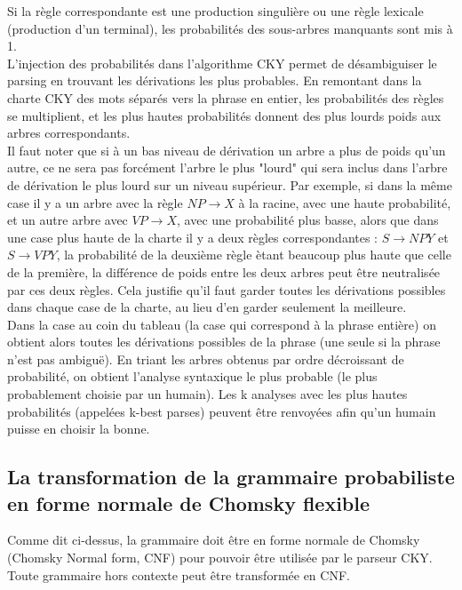 \documentclass[12pt]{article}
\begin{document}
Si la r\`egle correspondante est une production singuli\`ere ou une r\`egle lexicale
(production d'un terminal), les probabilit\'es des sous-arbres manquants sont mis
\`a 1. \\

L'injection des probabilit\'es dans l'algorithme CKY permet de d\'esambiguiser le
parsing en trouvant les d\'erivations les plus probables. En remontant dans la
charte CKY des mots s\'epar\'es vers la phrase en entier, les probabilit\'es des
r\`egles se multiplient, et les plus hautes probabilit\'es donnent des plus lourds
poids aux arbres correspondants. \\

Il faut noter que si \`a un bas niveau de
d\'erivation un arbre a plus de poids qu'un autre, ce ne sera pas forc\'ement
l'arbre le plus "lourd"  qui sera inclus dans l'arbre de d\'erivation le plus
lourd sur un niveau sup\'erieur. Par exemple, si dans la m\^eme case il y a un arbre
avec la r\`egle $NP \rightarrow X$ \`a la racine, avec une haute probabilit\'e, et un
autre arbre avec $VP \rightarrow X$, avec une probabilit\'e plus basse, alors que
dans une case plus haute de la charte il y a deux r\`egles correspondantes : $S
\rightarrow NP Y$ et $S \rightarrow VP Y$, la probabilit\'e de la deuxi\`eme r\`egle
\`etant beaucoup plus haute que celle de la premi\`ere, la diff\'erence de poids entre
les deux arbres peut \^etre neutralis\'ee par ces deux r\`egles. Cela justifie qu'il
faut garder toutes les d\'erivations possibles dans chaque case de la charte, au
lieu d'en garder seulement la meilleure. \\

Dans la case au coin du tableau (la case qui correspond \`a la phrase enti\`ere) on
obtient alors toutes les d\'erivations possibles de la phrase (une seule si la
phrase n'est pas ambiguë). En triant les arbres obtenus par ordre d\'ecroissant de
probabilit\'e, on obtient l'analyse syntaxique le plus probable (le plus
probablement choisie par un humain). Les k analyses avec les plus hautes
probabilit\'es (appel\'ees k-best parses) peuvent \^etre renvoy\'ees afin qu'un humain
puisse en choisir la bonne.


\subsection{La transformation de la grammaire probabiliste en forme normale de Chomsky flexible}

Comme dit ci-dessus, la grammaire doit \^etre en forme normale de Chomsky
(Chomsky Normal form, CNF) pour pouvoir \^etre utilis\'ee par le parseur CKY. Toute
grammaire hors contexte peut \^etre transform\'ee en CNF. \\
\end{document}
